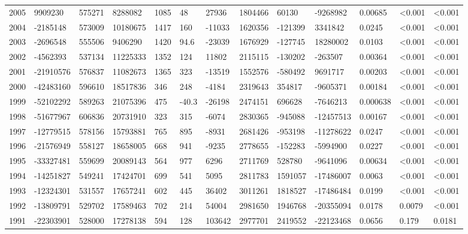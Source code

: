 \documentclass{article}
\begin{document}
\begin{table}[H]
\begin{tabular}{rllllllllllll}
  2005 & 9909230 & 575271 & 8288082 & 1085 & 48 & 27936 & 1804466 & 60130 & -9268982 & 0.00685 & \textless 0.001 & \textless 0.001 \\ 
  2004 & -2185148 & 573009 & 10180675 & 1417 & 160 & -11033 & 1620356 & -121399 & 3341842 & 0.0245 & \textless 0.001 & \textless 0.001 \\ 
  2003 & -2696548 & 555506 & 9406290 & 1420 & 94.6 & -23039 & 1676929 & -127745 & 18280002 & 0.0103 & \textless 0.001 & \textless 0.001 \\ 
  2002 & -4562393 & 537134 & 11225333 & 1352 & 124 & 11802 & 2115115 & -130202 & -263507 & 0.00364 & \textless 0.001 & \textless 0.001 \\ 
  2001 & -21910576 & 576837 & 11082673 & 1365 & 323 & -13519 & 1552576 & -580492 & 9691717 & 0.00203 & \textless 0.001 & \textless 0.001 \\ 
  2000 & -42483160 & 596610 & 18517836 & 346 & 248 & -4184 & 2319643 & 354817 & -9605371 & 0.00184 & \textless 0.001 & \textless 0.001 \\ 
  1999 & -52102292 & 589263 & 21075396 & 475 & -40.3 & -26198 & 2474151 & 696628 & -7646213 & 0.000638 & \textless 0.001 & \textless 0.001 \\ 
  1998 & -51677967 & 606836 & 20731910 & 323 & 315 & -6074 & 2830365 & -945088 & -12457513 & 0.00167 & \textless 0.001 & \textless 0.001 \\ 
  1997 & -12779515 & 578156 & 15793881 & 765 & 895 & -8931 & 2681426 & -953198 & -11278622 & 0.0247 & \textless 0.001 & \textless 0.001 \\ 
  1996 & -21576949 & 558127 & 18658005 & 668 & 941 & -9235 & 2778655 & -152283 & -5994900 & 0.0227 & \textless 0.001 & \textless 0.001 \\ 
  1995 & -33327481 & 559699 & 20089143 & 564 & 977 & 6296 & 2711769 & 528780 & -9641096 & 0.00634 & \textless 0.001 & \textless 0.001 \\ 
  1994 & -14251827 & 549241 & 17424701 & 699 & 541 & 5095 & 2811783 & 1591057 & -17486007 & 0.0063 & \textless 0.001 & \textless 0.001 \\ 
  1993 & -12324301 & 531557 & 17657241 & 602 & 445 & 36402 & 3011261 & 1818527 & -17486484 & 0.0199 & \textless 0.001 & \textless 0.001 \\ 
  1992 & -13809791 & 529702 & 17589463 & 702 & 214 & 54004 & 2981650 & 1946768 & -20355094 & 0.0178 & 0.0079 & \textless 0.001 \\ 
  1991 & -22303901 & 528000 & 17278138 & 594 & 128 & 103642 & 2977701 & 2419552 & -22123468 & 0.0656 & 0.179 & 0.0181 \\ 

\end{tabular}
\end{table}
\end{document}
